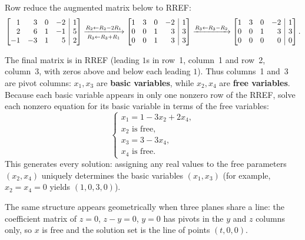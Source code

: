 \documentclass[10pt]{scrartcl}
\makeatletter
\newcommand{\aug}[2]{\left[\begin{array}{@{}#1@{}}#2\end{array}\right]}
\makeatother
\begin{document}
\begin{example*}
Row reduce the augmented matrix below to RREF:
\[
  \aug{rrrr|r}{1 & 3 & 0 & -2 & 1 \\ 2 & 6 & 1 & -1 & 5 \\ -1 & -3 & 1 & 5 & 2}
  \xrightarrow[R_3\leftarrow R_3+R_1]{R_2\leftarrow R_2-2R_1}
  \aug{rrrr|r}{1 & 3 & 0 & -2 & 1 \\ 0 & 0 & 1 & 3 & 3 \\ 0 & 0 & 1 & 3 & 3}
  \xrightarrow{R_3\leftarrow R_3-R_2}
  \aug{rrrr|r}{1 & 3 & 0 & -2 & 1 \\ 0 & 0 & 1 & 3 & 3 \\ 0 & 0 & 0 & 0 & 0}.
\]
\begin{steps}
  \ii The final matrix is in RREF (leading $1$s in row~1, column~1 and row~2, column~3, with zeros above and below each leading $1$). Thus columns~1 and~3 are pivot columns: $x_1,x_3$ are \textbf{basic variables}, while $x_2,x_4$ are \textbf{free variables}.
  \ii Because each basic variable appears in only one nonzero row of the RREF, solve each nonzero equation for its basic variable in terms of the free variables:
  \[
    \begin{cases}
      x_1 = 1 - 3x_2 + 2x_4, \\
      x_2 \text{ is free}, \\
      x_3 = 3 - 3x_4, \\
      x_4 \text{ is free}.
    \end{cases}
  \]
  This  generates every solution: assigning any real values to the free parameters $(x_2,x_4)$ uniquely determines the basic variables $(x_1,x_3)$ (for example, $x_2=x_4=0$ yields $(1,0,3,0)$).
\end{steps}
\end{example*}

The same structure appears geometrically when three planes share a line: the coefficient matrix of $z=0$, $z-y=0$, $y=0$ has pivots in the $y$ and $z$ columns only, so $x$ is free and the solution set is the line of points $(t,0,0)$.
\end{document}
